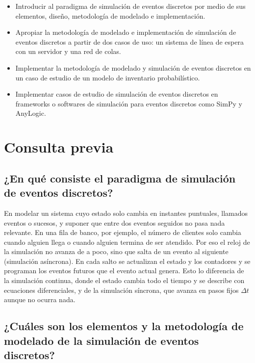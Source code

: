 \documentclass[11pt,letterpaper]{article}
\begin{document}
\begin{itemize}[itemsep=2pt]
    \item Introducir al paradigma de simulación de eventos discretos por medio de sus elementos, diseño, metodología de modelado e implementación.
    \item Apropiar la metodología de modelado e implementación de simulación de eventos discretos a partir de dos casos de uso: un sistema de línea de espera con un servidor y una red de colas.
    \item Implementar la metodología de modelado y simulación de eventos discretos en un caso de estudio de un modelo de inventario probabilístico.
    \item Implementar casos de estudio de simulación de eventos discretos en frameworks o softwares de simulación para eventos discretos como SimPy y AnyLogic.
\end{itemize}

\section{Consulta previa}

\subsection{¿En qué consiste el paradigma de simulación de eventos discretos?}

En modelar un sistema cuyo estado solo cambia en instantes puntuales, llamados eventos o sucesos, y
suponer que entre dos eventos seguidos no pasa nada relevante. En una fila de banco, por ejemplo, el número
de clientes solo cambia cuando alguien llega o cuando alguien termina de ser atendido. Por eso el reloj de la
simulación no avanza de a poco, sino que salta de un evento al siguiente (simulación asíncrona). En cada salto
se actualizan el estado y los contadores y se programan los eventos futuros que el evento actual genera. Esto
lo diferencia de la simulación continua, donde el estado cambia todo el tiempo y se describe con ecuaciones
diferenciales, y de la simulación síncrona, que avanza en pasos fijos $\Delta t$ aunque no ocurra nada.

\subsection{¿Cuáles son los elementos y la metodología de modelado de la simulación de eventos discretos?}
\end{document}
